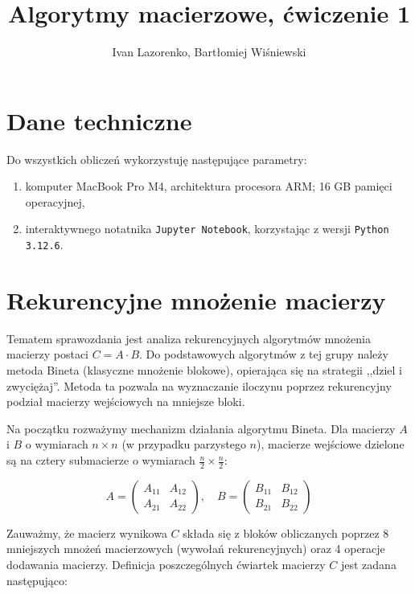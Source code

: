 \documentclass{article}
\title{Algorytmy macierzowe, ćwiczenie 1}
\author{Ivan Lazorenko, Bartłomiej Wiśniewski}
\begin{document}
\maketitle
\thispagestyle{empty} %


\section{Dane techniczne}

Do wszystkich obliczeń wykorzystuję następujące parametry:

\begin{enumerate}
    \item komputer MacBook Pro M4, architektura procesora ARM; 16 GB pamięci operacyjnej, 
    \item interaktywnego notatnika \texttt{Jupyter Notebook}, korzystając z wersji \texttt{Python 3.12.6}.
\end{enumerate}

\section{Rekurencyjne mnożenie macierzy}

Tematem sprawozdania jest analiza rekurencyjnych algorytmów mnożenia macierzy postaci $C = A \cdot B$. Do podstawowych algorytmów z tej grupy należy metoda Bineta (klasyczne mnożenie blokowe), opierająca się na strategii ,,dziel i zwyciężaj''. Metoda ta pozwala na wyznaczanie iloczynu poprzez rekurencyjny podział macierzy wejściowych na mniejsze bloki.

Na początku rozważymy mechanizm działania algorytmu Bineta. Dla macierzy $A$ i $B$ o wymiarach $n \times n$ (w przypadku parzystego $n$), macierze wejściowe dzielone są na cztery submacierze o wymiarach $\frac{n}{2} \times \frac{n}{2}$:

\[
A = \begin{pmatrix} 
A_{11} & A_{12} \\ 
A_{21} & A_{22} 
\end{pmatrix}, \quad
B = \begin{pmatrix} 
B_{11} & B_{12} \\ 
B_{21} & B_{22} 
\end{pmatrix}
\]

Zauważmy, że macierz wynikowa $C$ składa się z bloków obliczanych poprzez 8 mniejszych mnożeń macierzowych (wywołań rekurencyjnych) oraz 4 operacje dodawania macierzy. Definicja poszczególnych ćwiartek macierzy $C$ jest zadana następująco:
\end{document}
